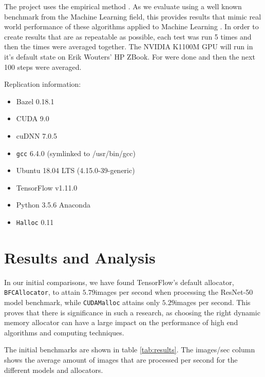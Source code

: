 \documentclass[12pt,twoside]{article}
\newcommand{\resnettimebfc}{$5.79$}     %
\newcommand{\resnettimecuda}{$5.29$}    %
\begin{document}
The project uses the empirical method \cite{bock2001}. As we evaluate using a well known benchmark from the Machine Learning field, this provides results that mimic real world performance of these algorithms applied to Machine Learning \cite{abadi2016}. In order to create results that are as repeatable as possible, each test was run 5 times and then the times were averaged together. The NVIDIA K1100M GPU will run in it's default state on Erik Wouters' HP ZBook. For were done and then the next 100 steps were averaged. 

Replication information:
\begin{itemize}
\vspace{-5px}
\itemsep-0.25em 
    \item Bazel 0.18.1
    \item CUDA 9.0
    \item cuDNN 7.0.5 %
    \item \texttt{gcc} 6.4.0 (symlinked to /usr/bin/gcc)
    \item Ubuntu 18.04 LTS (4.15.0-39-generic)
    \item TensorFlow v1.11.0
    \item Python 3.5.6 Anaconda
    \item \texttt{Halloc} 0.11
\vspace{-10px}
\end{itemize}




\section{Results and Analysis}
\label{sec:results-and-analysis}

In our initial comparisons, we have found TensorFlow's default allocator, \texttt{BFCAllocator}, to attain \resnettimebfc images per second when processing the ResNet-50 model benchmark, while \texttt{CUDAMalloc} attains only \resnettimecuda images per second. This proves that there is significance in such a research, as choosing the right dynamic memory allocator can have a large impact on the performance of high end algorithms and computing techniques.

The initial benchmarks are shown in table \ref{tab:results}. The images/sec column shows the average amount of images that are processed per second for the different models and allocators.
\end{document}
